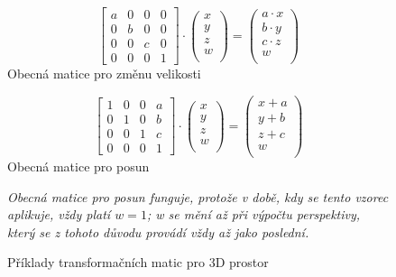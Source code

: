 \documentclass[a4paper, 11pt]{report}
\begin{document}
\begin{figure}[h]
    \begin{minipage}{0.45\textwidth}
        \[
        \begin{bmatrix}
            a&0&0&0\\
            0&b&0&0\\
            0&0&c&0\\
            0&0&0&1
        \end{bmatrix}
        \cdot
        \begin{pmatrix}
            x\\
            y\\
            z\\
            w\\
        \end{pmatrix}
        =
        \begin{pmatrix}
            a \cdot x\\
            b \cdot y\\
            c \cdot z\\
            w\\
        \end{pmatrix}
        \]
        \centering
        \small Obecná matice pro změnu velikosti
    \end{minipage}
    \qquad
    \begin{minipage}{0.45\textwidth}
        \[
        \begin{bmatrix}
            1&0&0&a\\
            0&1&0&b\\
            0&0&1&c\\
            0&0&0&1
        \end{bmatrix}
        \cdot
        \begin{pmatrix}
            x\\
            y\\
            z\\
            w\\
        \end{pmatrix}
        =
        \begin{pmatrix}
            x + a\\
            y + b\\
            z + c\\
            w\\
        \end{pmatrix}
        \]
        \centering
        \small Obecná matice pro posun
    \end{minipage}
    \caption{Příklady transformačních matic pro 3D prostor}
    \small\emph{
    Obecná matice pro posun funguje, protože v době, kdy se tento vzorec aplikuje, vždy platí \(w=1\); \emph{w} se mění až při výpočtu perspektivy, který se z tohoto důvodu provádí vždy až jako poslední.
    }
\end{figure}
\end{document}
